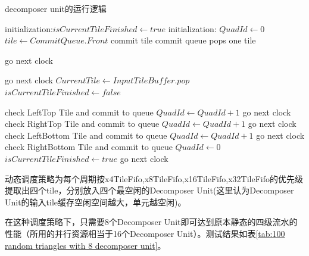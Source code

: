 \begin{algorithm}
\caption{\label{algorithm:decomposer unit}decomposer unit的运行逻辑}
    \begin{algorithmic}
        \STATE initialization:$isCurrentTileFinished \gets true$ 
        \STATE initialization: $QuadId \gets 0$
            \STATE $tile \gets CommitQueue.Front$
                    \STATE commit tile
                    \STATE commit queue pops one tile
            \ENDIF 
        \ENDIF

            \STATE go next clock
        \ENDIF

                \STATE go next clock
            \ELSE
                \STATE $CurrentTile \gets InputTileBuffer.pop$
                \STATE $isCurrentTileFinished \gets false$
            \ENDIF
        \ENDIF

            \STATE check LeftTop Tile and commit to queue
            \STATE $QuadId \gets QuadId + 1$
            \STATE go next clock
            \STATE check RightTop Tile and commit to queue
            \STATE $QuadId \gets QuadId + 1$
            \STATE go next clock
            \STATE check LeftBottom Tile and commit to queue
            \STATE $QuadId \gets QuadId + 1$
            \STATE go next clock
            \STATE check RightBottom Tile and commit to queue
            \STATE $QuadId \gets 0$
            \STATE $isCurrentTileFinished \gets true$
            \STATE go next clock
        \ENDIF
        
    \end{algorithmic}
\end{algorithm}

动态调度策略为每个周期按x4TileFifo,x8TileFifo,x16TileFifo,x32TileFifo的优先级提取出四个tile，分别放入四个最空闲的Decomposer Unit(这里认为Decomposer Unit的输入tile缓存空闲空间越大，单元越空闲)。

在这种调度策略下，只需要8个Decomposer Unit即可达到原本静态的四级流水的性能（所用的并行资源相当于16个Decomposer Unit）。测试结果如表\ref{tab:100 random triangles with 8 decomposer unit}。


